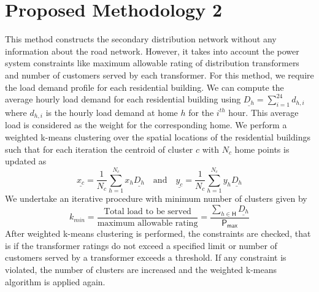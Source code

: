 \documentclass[11pt,letterpaper]{article}
\begin{document}
\section{Proposed Methodology 2}
This method constructs the secondary distribution network without any information about the road network. However, it takes into account the power system constraints like maximum allowable rating of distribution transformers and number of customers served by each transformer. For this method, we require the load demand profile for each residential building. We can compute the average hourly load demand for each residential building using $\underline{D_{h}}=\sum_{i=1}^{24}d_{h,i}$ where $d_{h,i}$ is the hourly load demand at home $h$ for the $i^{th}$ hour. This average load is considered as the weight for the corresponding home. We perform a weighted k-means clustering over the spatial locations of the residential buildings such that for each iteration the centroid of cluster $c$ with $N_c$ home points is updated as
\begin{equation}
\underline{x_c}=\dfrac{1}{N_c}\sum_{h=1}^{N_c}x_h\underline{D_{h}}\quad \textrm{and} \quad\underline{y_c}=\dfrac{1}{N_c}\sum_{h=1}^{N_c}y_h\underline{D_{h}}
\end{equation}
We undertake an iterative procedure with minimum number of clusters given by
\begin{equation}
k_{min}=\dfrac{\textrm{Total load to be served}}{\textrm{maximum allowable rating}}=\dfrac{\sum_{h\in\mathsf{H}}{\underline{D_h}}}{\mathsf{P_{max}}}
\end{equation}
After weighted k-means clustering is performed, the constraints are checked, that is if the transformer ratings do not exceed a specified limit or number of customers served by a transformer exceeds a threshold. If any constraint is violated, the number of clusters are increased and the weighted k-means algorithm is applied again.
\end{document}
